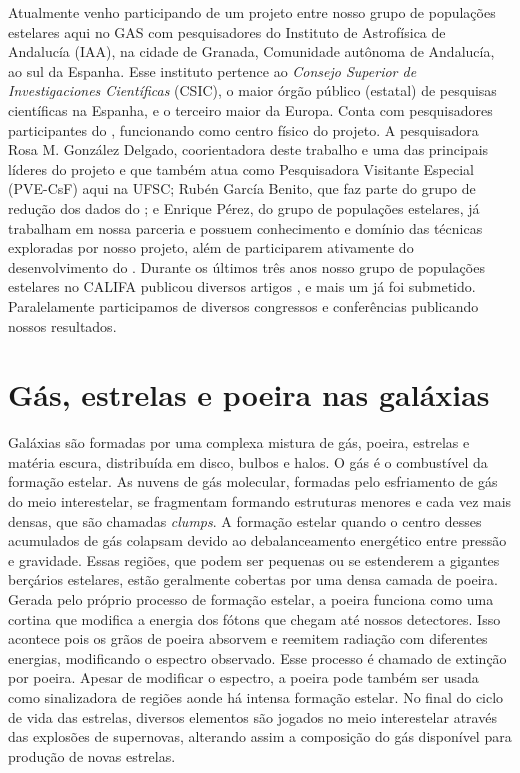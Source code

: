 Atualmente venho participando de um projeto entre nosso grupo de populações estelares aqui no GAS
com pesquisadores do Instituto de Astrofísica de Andalucía (IAA), na cidade de Granada, Comunidade
autônoma de Andalucía, ao sul da Espanha. Esse instituto pertence ao {\em Consejo Superior de
Investigaciones Científicas} (CSIC), o maior órgão público (estatal) de pesquisas científicas na
Espanha, e o terceiro maior da Europa. Conta com pesquisadores participantes do \PCAL, funcionando
como centro físico do projeto. A pesquisadora Rosa M. González Delgado, coorientadora deste
trabalho e uma das principais líderes do projeto e que também atua como Pesquisadora Visitante
Especial (PVE-CsF) aqui na UFSC; Rubén García Benito, que faz parte do grupo de redução dos dados do
\CALS; e Enrique Pérez, do grupo de populações estelares, já trabalham em nossa parceria e possuem
conhecimento e domínio das técnicas exploradas por nosso projeto, além de participarem ativamente do
desenvolvimento do \PCAL. Durante os últimos três anos nosso grupo de populações estelares no CALIFA
publicou diversos artigos \citep[e.g., ][]{Perez.etal.2013a, GonzalezDelgado.etal.2014a,
GonzalezDelgado.etal.2014b, GonzalezDelgado.etal.2015a}, e mais um já foi submetido. Paralelamente
participamos de diversos congressos e conferências publicando nossos resultados.


\section{Gás, estrelas e poeira nas galáxias}
\label{sec:intro:galaxias}

Galáxias são formadas por uma complexa mistura de gás, poeira, estrelas e matéria escura,
distribuída em disco, bulbos e halos. O gás é o combustível da formação estelar. As nuvens de gás
molecular, formadas pelo esfriamento de gás do meio interestelar, se fragmentam formando estruturas
menores e cada vez mais densas, que são chamadas {\em clumps}. A formação estelar quando o centro
desses acumulados de gás colapsam devido ao debalanceamento energético entre pressão e gravidade.
Essas regiões, que podem ser pequenas ou se estenderem a gigantes berçários estelares, estão
geralmente cobertas por uma densa camada de poeira. Gerada pelo próprio processo de formação
estelar, a poeira funciona como uma cortina que modifica a energia dos fótons que chegam até nossos
detectores. Isso acontece pois os grãos de poeira absorvem e reemitem radiação com diferentes
energias, modificando o espectro observado. Esse processo é chamado de extinção por poeira. Apesar
de modificar o espectro, a poeira pode também ser usada como sinalizadora de regiões aonde há
intensa formação estelar. No final do ciclo de vida das estrelas, diversos elementos são jogados no
meio interestelar através das explosões de supernovas, alterando assim a composição do gás
disponível para produção de novas estrelas.

